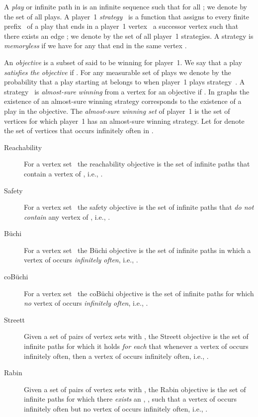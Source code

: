 \documentclass[11pt,letterpaper]{article}
\newcommand{\lu}{\textup{(}}
\newcommand{\ru}{\textup{)}\xspace}
\newcommand{\upbr}[1]{\lu #1\ru}
\newif\iffullversion
\newcommand{\infull}[1]{\iffullversion #1\fi}
\begin{document}
\smallskip{} 
A \emph{play} or infinite path in  is an infinite sequence  such that  for all ;
we denote by  the set of all plays.
A player~1 \emph{strategy}~ is a function that 
assigns to every finite prefix~ of a play that ends in a 
player~1 vertex~ a successor vertex  such that 
there exists an edge ; we denote by  the 
set of all player~1 strategies. A strategy is \emph{memoryless} if we have 
 for any  that 
end in the same vertex .

\smallskip{} 
An \emph{objective} 
is a subset of  said to be winning for player~1. We say that a 
play  \emph{satisfies the objective} if . 
For any measurable set of plays 
we denote by  the probability that a play starting at 
belongs to  when player~1 plays strategy~. 
A strategy~ is \emph{almost-sure\infull{ \upbr{a.s.}} winning} from a vertex 
for an objective  if . In graphs the existence 
of an almost-sure winning strategy corresponds to the existence of a play in the objective. The \emph{almost-sure 
winning set} 
of player~1 is the set of vertices for which player~1 has an
almost-sure winning strategy. \infull{Computing the almost-sure winning set for some 
objective is also called \emph{qualitative analysis} of MDPs. Below we define 
the objectives used in this work. }Let  for  denote
the set of vertices that occurs infinitely often in .
\begin{description}
    \item[Reachability] For a vertex 
    set~ the reachability 
	objective is the set of infinite paths that contain a vertex of , i.e., 
	.
	
	\item[Safety] For a vertex set~ the safety 
	objective is the set of infinite paths that \emph{do not contain} any vertex 
	of , i.e., 
	.
	
    \item[B{\"u}chi] For a vertex set~ the B{\"u}chi 
	objective is the set of infinite paths in which a vertex of  occurs
	\emph{infinitely often}, i.e., 
	.
	
    \item[coB{\"u}chi] For a 
    vertex set~ the coB{\"u}chi 
	objective is the set of infinite paths for which \emph{no} vertex of  
	occurs \emph{infinitely often}, i.e., 
	.
	
    \item[Streett] Given a set  of
	 pairs  of vertex sets  with , the Streett objective is the set of infinite paths 
	for which it holds \emph{for each}  that whenever a vertex of  
	occurs infinitely often, then a vertex of  occurs infinitely often, i.e., 
	.
	
    \item[Rabin] Given a set  of  pairs  of vertex sets  with , the Rabin objective is the set of infinite paths 
	for which there \emph{exists} an , , such that a vertex of  
	occurs infinitely often but no vertex of  occurs infinitely often, i.e., 
	.
\end{description}
\end{document}
